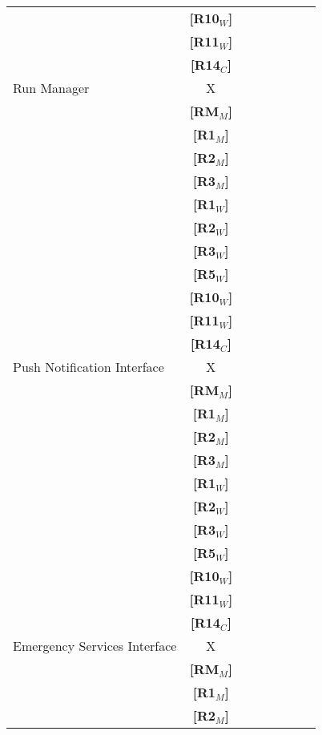 \begin{tabular}{l*{6}{c}r}
                        & \textbf{[R10$_W$]}\\
                        & \textbf{[R11$_W$]}\\
                        & \textbf{[R14$_C$]}\\
    \hline
    Run Manager & X   \\
                        & \textbf{[RM$_M$]}\\
                        & \textbf{[R1$_M$]}\\
                        & \textbf{[R2$_M$]}\\
                        & \textbf{[R3$_M$]}\\
                        & \textbf{[R1$_W$]}\\
                        & \textbf{[R2$_W$]}\\
                        & \textbf{[R3$_W$]}\\
                        & \textbf{[R5$_W$]}\\
                        & \textbf{[R10$_W$]}\\
                        & \textbf{[R11$_W$]}\\
                        & \textbf{[R14$_C$]}\\
    \hline
    Push Notification Interface & X   \\
                        & \textbf{[RM$_M$]}\\
                        & \textbf{[R1$_M$]}\\
                        & \textbf{[R2$_M$]}\\
                        & \textbf{[R3$_M$]}\\
                        & \textbf{[R1$_W$]}\\
                        & \textbf{[R2$_W$]}\\
                        & \textbf{[R3$_W$]}\\
                        & \textbf{[R5$_W$]}\\
                        & \textbf{[R10$_W$]}\\
                        & \textbf{[R11$_W$]}\\
                        & \textbf{[R14$_C$]}\\
    \hline
    Emergency Services Interface & X \\
                        & \textbf{[RM$_M$]}\\
                        & \textbf{[R1$_M$]}\\
                        & \textbf{[R2$_M$]}\\

\end{tabular}
